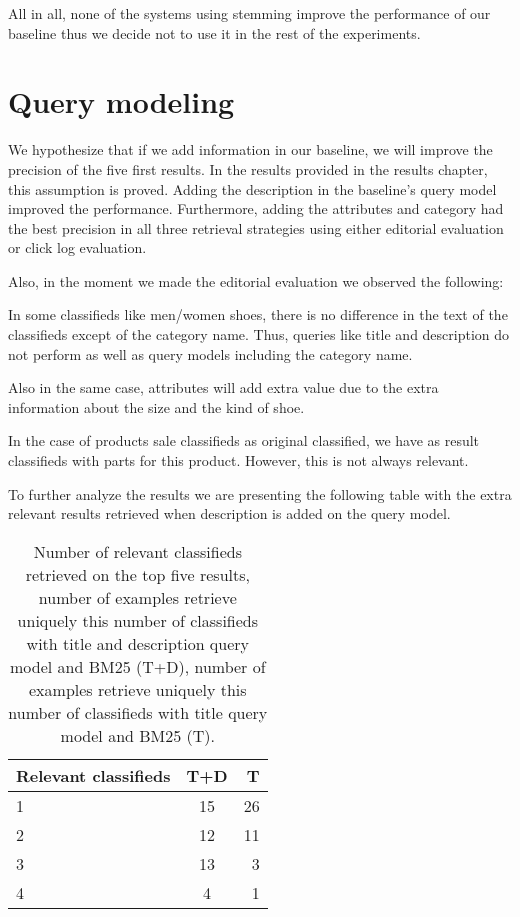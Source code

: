 All in all, none of the systems using stemming improve the performance of our baseline thus we decide not to use it in the rest of the experiments.

\section{Query modeling}

We hypothesize that if we add information in our baseline, we will improve the precision of the five first results. In the results provided in the results chapter, this assumption is proved. Adding the description in the baseline's query model improved the performance. Furthermore, adding the attributes and category had the best precision in all three retrieval strategies using either editorial evaluation or click log evaluation.

Also, in the moment we made the editorial evaluation we observed the following:

\begin{list}{.}{}
\item{In some classifieds like men/women shoes, there is no difference in the text of the classifieds except of the category name. Thus, queries like title and description do not perform as well as query models including the category name.}
\item{Also in the same case, attributes will add extra value due to the extra information about the size and the kind of shoe.}
\item{In the case of products sale classifieds as original classified, we have as result classifieds with parts for this product. However, this is not always relevant.}
\end{list}
To further analyze the results we are presenting the following table with the extra relevant results retrieved when description is added on the query model.


\begin{table}[H]
\begin{center}
\caption{Number of relevant classifieds retrieved on the top five results, number of examples retrieve uniquely this number of classifieds with title and description query model and BM25 (T+D), number of examples retrieve uniquely this number of classifieds with title query model and BM25 (T).}
\begin{tabular}{lcr}
\midrule
Relevant classifieds & T+D & T \\
\midrule
	1 & 15 & 26 \\
	2 & 12 & 11  \\
	3 & 13 & 3 \\
	4 & 4 & 1  \\
\bottomrule
\end{tabular}
\end{center}
\end{table}

